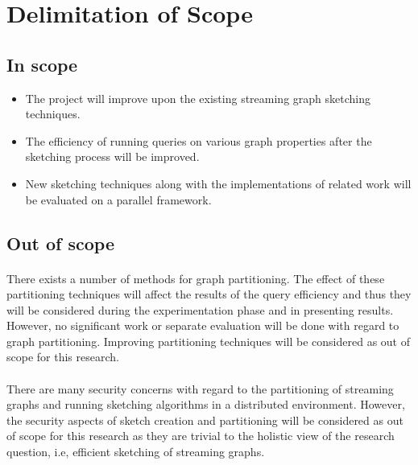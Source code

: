 \section{Delimitation of Scope}

\subsection{In scope}

\begin{itemize}
    \item The project will improve upon the existing streaming graph sketching techniques.
    \item The efficiency of running queries on various graph properties after the sketching process will be improved.
    \item New sketching techniques along with the implementations of related work will be evaluated on a parallel framework.
\end{itemize}

\subsection{Out of scope}

\paragraph{}
There exists a number of methods for graph partitioning. The effect of these partitioning techniques will affect the results of the query efficiency and thus they will be considered during the experimentation phase and in presenting results. However, no significant work or separate evaluation will be done with regard to graph partitioning. Improving partitioning techniques will be considered as out of scope for this research.

\paragraph{}
There are many security concerns with regard to the partitioning of streaming graphs and running sketching algorithms in a distributed environment. However, the security aspects of sketch creation and partitioning will be considered as out of scope for this research as they are trivial to the holistic view of the research question, i.e, efficient sketching of streaming graphs.